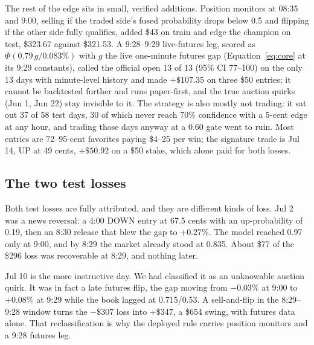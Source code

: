 The rest of the edge sits in small, verified additions. Position monitors at
08:35 and 9:00, selling if the traded side's fused probability drops below
0.5 and flipping if the other side fully qualifies, added \$43 on train and edge
the champion on test, \$323.67 against \$321.53. A 9:28--9:29 live-futures
leg, scored as $\Phi(0.79\,g / 0.083\%)$ with $g$ the live one-minute
futures gap (Equation~\ref{eq:core} at its 9:29 constants), called the
official open 13 of 13 (95\% CI 77--100) on the only 13 days with minute-level
history and made $+\$107.35$ on three \$50 entries; it cannot be backtested
further and runs paper-first, and the true auction quirks (Jun 1, Jun 22)
stay invisible to it. The strategy is also mostly not trading: it sat out 37
of 58 test days, 30 of which never reach 70\% confidence with a 5-cent edge
at any hour, and trading those days anyway at a 0.60 gate went to ruin. Most
entries are 72--95-cent favorites paying \$4--25 per win; the signature
trade is Jul 14, UP at 49 cents, $+\$50.92$ on a \$50 stake, which alone
paid for both losses.

\subsection{The two test losses}
\label{app:execution_losses}

Both test losses are fully attributed, and they are different kinds of
loss. Jul 2 was a news reversal: a 4:00 DOWN entry at 67.5 cents with an
up-probability of 0.19, then an 8:30 release that blew the gap to
$+0.27\%$. The model reached 0.97 only at 9:00, and by 8:29 the market
already stood at 0.835. About \$77 of the \$296 loss was recoverable at
8:29, and nothing later.

Jul 10 is the more instructive day. We had classified it as an unknowable
auction quirk. It was in fact a late futures flip, the gap moving from
$-0.03\%$ at 9:00 to $+0.08\%$ at 9:29 while the book lagged at
0.715/0.53. A sell-and-flip in the 8:29--9:28 window turns the $-\$307$
loss into $+\$347$, a \$654 swing, with futures data alone. That
reclassification is why the deployed rule carries position monitors and a
9:28 futures leg.
